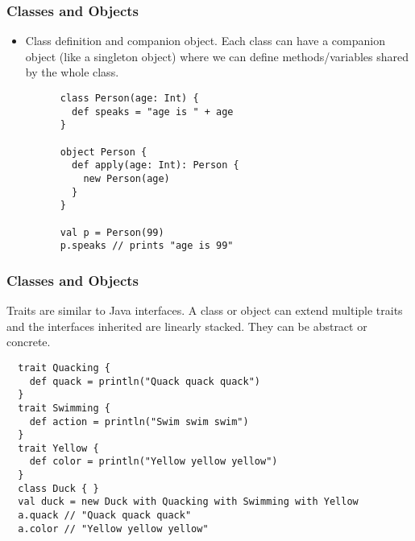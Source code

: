 \documentclass[handout]{beamer}
\begin{document}
\begin{frame}[fragile]
  \frametitle{Classes and Objects}
  \begin{itemize}
    \item Class definition and companion object. Each class can have a companion object (like a singleton object) where we can define methods/variables shared by the whole class.
      \begin{verbatim}
      class Person(age: Int) {
        def speaks = "age is " + age
      }

      object Person {
        def apply(age: Int): Person {
          new Person(age)
        }
      }

      val p = Person(99)
      p.speaks // prints "age is 99"
      \end{verbatim}
  \end{itemize}
\end{frame}

\begin{frame}[fragile]
  \frametitle{Classes and Objects}
  Traits are similar to Java interfaces. A class or object can extend multiple traits and the interfaces inherited are linearly stacked. They can be abstract or concrete.
  \begin{verbatim}
  trait Quacking {
    def quack = println("Quack quack quack")
  }
  trait Swimming {
    def action = println("Swim swim swim")
  }
  trait Yellow {
    def color = println("Yellow yellow yellow")
  }
  class Duck { }
  val duck = new Duck with Quacking with Swimming with Yellow
  a.quack // "Quack quack quack"
  a.color // "Yellow yellow yellow"
  \end{verbatim}
\end{frame}
\end{document}

